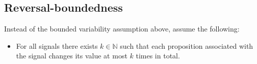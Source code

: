 \documentclass[envcountsame, runningheads]{llncs}
\newcommand{\N}{\mathbb{N}}
\newcommand{\?}{\text{?}}
\begin{document}
	\subsection*{Reversal-boundedness}
	Instead of the bounded variability assumption above, assume the following:
	\begin{itemize}
		\item For all signals there exists $k \in \N$ such that each proposition associated with the signal changes its value at most $k$ times in total.
	\end{itemize}
	
		
	
	\newpage
	
	
	\newpage
	
		
	\newpage
	
	
\end{document}
